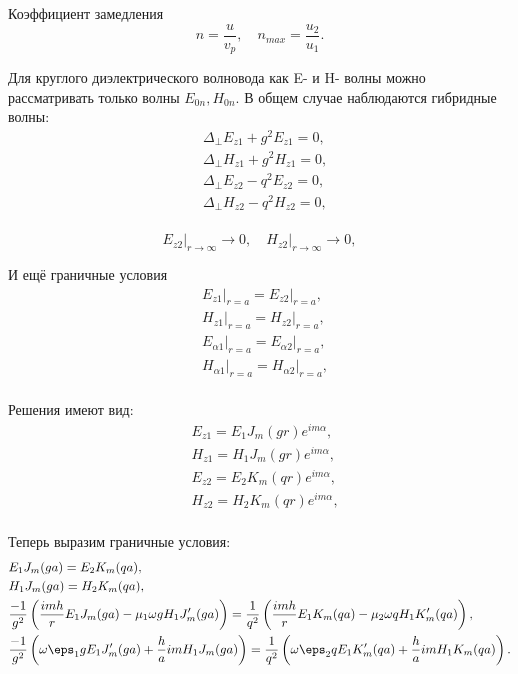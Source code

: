 Коэффициент замедления
\[
	n = \frac{u}{v_p},\quad n_{max} = \frac{u_2}{u_1}.
\]

Для круглого диэлектрического волновода как E- и H- волны можно рассматривать только волны \( E_{0n}, H_{0n} \). В общем случае наблюдаются гибридные волны:
\begin{align*}
	& \Delta_\perp E_{z1} + g^2 E_{z1} = 0,\\
	& \Delta_\perp H_{z1} + g^2 H_{z1} = 0,\\
	& \Delta_\perp E_{z2} - q^2 E_{z2} = 0,\\
	& \Delta_\perp H_{z2} - q^2 H_{z2} = 0,\\
\end{align*}

\[
	\left.E_{z2}\right|_{r\to\infty} \to 0,\quad
	\left.H_{z2}\right|_{r\to\infty} \to 0,
\]

И ещё граничные условия
\begin{align*}
	& \left.E_{z1}\right|_{r=a} = \left.E_{z2}\right|_{r=a},\\
	& \left.H_{z1}\right|_{r=a} = \left.H_{z2}\right|_{r=a},\\
	& \left.E_{\alpha1}\right|_{r=a} = \left.E_{\alpha2}\right|_{r=a},\\
	& \left.H_{\alpha1}\right|_{r=a} = \left.H_{\alpha2}\right|_{r=a},\\
\end{align*}

Решения имеют вид:
\begin{align*}
	& E_{z1} = E_1 J_m(gr)e^{im\alpha},\\
	& H_{z1} = H_1 J_m(gr)e^{im\alpha},\\
	& E_{z2} = E_2 K_m(qr)e^{im\alpha},\\
	& H_{z2} = H_2 K_m(qr)e^{im\alpha},\\
\end{align*}

Теперь выразим граничные условия:
\begin{align*}
	& E_1 J_m(ga) = E_2 K_m(qa),\\
	& H_1 J_m(ga) = H_2 K_m(qa),\\
	& \frac{-1}{g^2}\left(\frac{imh}{r}E_1 J_m(ga) -
	\mu_1\omega g H_1 J_m'(ga)\right) =
	\frac{1}{q^2}\left(\frac{imh}{r}E_1 K_m(qa) -
	\mu_2\omega q H_1 K_m'(qa)\right),\\
	& \frac{-1}{g^2}\left(\omega\eps_1 g E_1 J_m'(ga) + \frac{h}{a}im H_1 J_m(ga)\right) = \frac{1}{q^2}\left(\omega\eps_2 q E_1 K_m'(qa) + \frac{h}{a}im H_1 K_m(qa)\right).
\end{align*}

